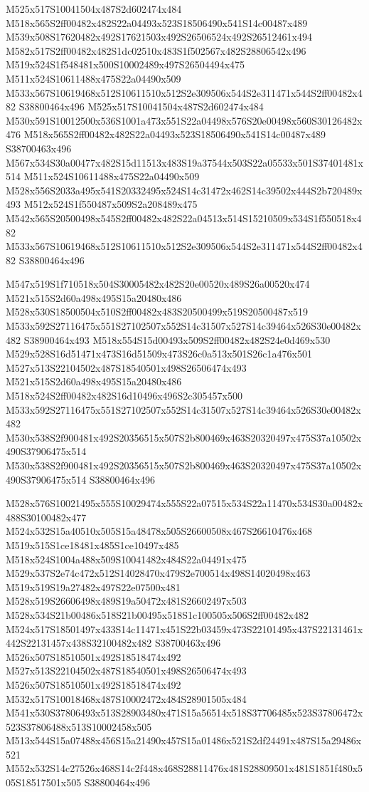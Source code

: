 \documentclass{article}
\begin{document}
\begin{multicols}{2}
M525x517S10041504x487S2d602474x484 M518x565S2ff00482x482S22a04493x523S18506490x541S14c00487x489 M539x508S17620482x492S17621503x492S26506524x492S26512461x494 M582x517S2ff00482x482S1dc02510x483S1f502567x482S28806542x496 M519x524S1f548481x500S10002489x497S26504494x475 M511x524S10611488x475S22a04490x509 M533x567S10619468x512S10611510x512S2e309506x544S2e311471x544S2ff00482x482 S38800464x496 M525x517S10041504x487S2d602474x484 M530x591S10012500x536S1001a473x551S22a04498x576S20e00498x560S30126482x476 M518x565S2ff00482x482S22a04493x523S18506490x541S14c00487x489 S38700463x496 M567x534S30a00477x482S15d11513x483S19a37544x503S22a05533x501S37401481x514 M511x524S10611488x475S22a04490x509 M528x556S2033a495x541S20332495x524S14c31472x462S14c39502x444S2b720489x493 M512x524S1f550487x509S2a208489x475 M542x565S20500498x545S2ff00482x482S22a04513x514S15210509x534S1f550518x482 M533x567S10619468x512S10611510x512S2e309506x544S2e311471x544S2ff00482x482 S38800464x496

M547x519S1f710518x504S30005482x482S20e00520x489S26a00520x474 M521x515S2d60a498x495S15a20480x486 M528x530S18500504x510S2ff00482x483S20500499x519S20500487x519 M533x592S27116475x551S27102507x552S14c31507x527S14c39464x526S30e00482x482 S38900464x493 M518x554S15d00493x509S2ff00482x482S24e0d469x530 M529x528S16d51471x473S16d51509x473S26c0a513x501S26c1a476x501 M527x513S22104502x487S18540501x498S26506474x493 M521x515S2d60a498x495S15a20480x486 M518x524S2ff00482x482S16d10496x496S2c305457x500 M533x592S27116475x551S27102507x552S14c31507x527S14c39464x526S30e00482x482 M530x538S2f900481x492S20356515x507S2b800469x463S20320497x475S37a10502x490S37906475x514 M530x538S2f900481x492S20356515x507S2b800469x463S20320497x475S37a10502x490S37906475x514 S38800464x496

M528x576S10021495x555S10029474x555S22a07515x534S22a11470x534S30a00482x488S30100482x477 M524x532S15a40510x505S15a48478x505S26600508x467S26610476x468 M519x515S1ce18481x485S1ce10497x485 M518x524S1004a488x509S10041482x484S22a04491x475 M529x537S2e74c472x512S14028470x479S2e700514x498S14020498x463 M519x519S19a27482x497S22e07500x481 M528x519S26606498x489S19a50472x481S26602497x503 M528x534S21b00486x518S21b00495x518S1c100505x506S2ff00482x482 M524x517S18501497x433S14c11471x451S22b03459x473S22101495x437S22131461x442S22131457x438S32100482x482 S38700463x496 M526x507S18510501x492S18518474x492 M527x513S22104502x487S18540501x498S26506474x493 M526x507S18510501x492S18518474x492 M532x517S10018468x487S10002472x484S28901505x484 M541x530S37806493x513S28903480x471S15a56514x518S37706485x523S37806472x523S37806488x513S10002458x505 M513x544S15a07488x456S15a21490x457S15a01486x521S2df24491x487S15a29486x521 M552x532S14c27526x468S14c2f448x468S28811476x481S28809501x481S1851f480x505S18517501x505 S38800464x496


\end{multicols}
\end{document}

